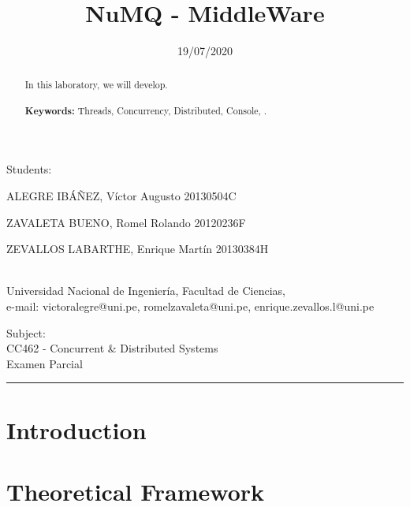 \documentclass[10pt,a4paper]{article}
\theoremstyle{definition}
\begin{document}
	
\title{NuMQ - MiddleWare}
\date{19/07/2020}
\maketitle

\begin{center}
	Students:\\
	\vspace{5pt}
	{\large ALEGRE IB\'A\~NEZ, V\'ictor Augusto 20130504C

ZAVALETA BUENO, Romel Rolando 20120236F

ZEVALLOS LABARTHE, Enrique Mart\'in 20130384H}\\
	Universidad Nacional de Ingenier\'ia, Facultad de Ciencias,\\
	e-mail: victoralegre@uni.pe, romelzavaleta@uni.pe, enrique.zevallos.l@uni.pe
	
\end{center}
\vspace{5pt}
\begin{center}
	Subject:\\
	\vspace{5pt}
	{\large CC462 - Concurrent \& Distributed Systems
}\\
	{\large Examen Parcial}\\
	

	
\end{center}
\vspace{20pt}
\begin{abstract}
{\small
\hspace*{0.5cm}
	In this laboratory, we will develop.\\\\
\textbf{Keywords:} Threads, Concurrency, Distributed, Console, .
}
\end{abstract}




\tableofcontents

\vspace{20pt}
\hrule
\vspace{10pt}

\section{Introduction}


\section{Theoretical Framework}
\end{document}
